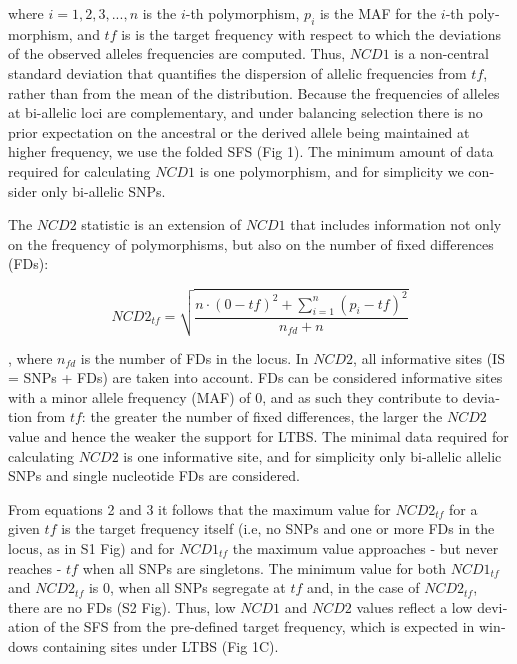 \begin{refsection}
\begin{otherlanguage}{english}
where $i={1,2,3,...,n}$ is the $i$-th polymorphism, $p_{i}$ is the MAF for the $i$-th polymorphism, and $tf$ is is the target frequency with respect to which the deviations of the observed alleles frequencies are computed. Thus, $NCD1$ is a non-central standard deviation that quantifies the dispersion of allelic frequencies from $tf$, rather than from the mean of the distribution. Because the frequencies of alleles at bi-allelic loci are complementary, and under balancing selection there is no prior expectation on the ancestral or the derived allele being maintained at higher frequency, we use the folded SFS (Fig 1). The minimum amount of data required for calculating $NCD1$ is one polymorphism, and for simplicity we consider only bi-allelic SNPs.

The $NCD2$ statistic is an extension of $NCD1$ that includes information not only on the frequency of polymorphisms, but also on the number of fixed differences (FDs):

\begin{equation}
NCD2_{tf}=\sqrt{\frac{n \cdot (0-tf)^2 + \sum\limits_{i=1}^n(p_{i}-tf)^2}{n_{fd}+n}}
\end{equation}

, where $n_{fd}$ is the number of FDs in the locus. In $NCD2$, all informative sites (IS = SNPs + FDs) are taken into account. FDs can be considered informative sites with a minor allele frequency (MAF) of 0, and as such they contribute to deviation from $tf$: the greater the number of fixed differences, the larger the $NCD2$ value and hence the weaker the support for LTBS. The minimal data required for calculating $NCD2$ is one informative site, and for simplicity only bi-allelic allelic SNPs and single nucleotide FDs are considered.

From equations 2 and 3 it follows that the maximum value for $NCD2_{tf}$ for a given $tf$ is the target frequency itself (i.e, no SNPs and one or more FDs in the locus, as in S1 Fig) and for $NCD1_{tf}$ the maximum value approaches - but never reaches - $tf$ when all SNPs are singletons. The minimum value for both $NCD1_{tf}$ and $NCD2_{tf}$ is 0, when all SNPs segregate at $tf$ and, in the case of $NCD2_{tf}$, there are no FDs (S2 Fig). Thus, low $NCD1$ and $NCD2$ values reflect a low deviation of the SFS from the pre-defined target frequency, which is expected in windows containing sites under LTBS (Fig 1C).

\end{otherlanguage}
\end{refsection}
